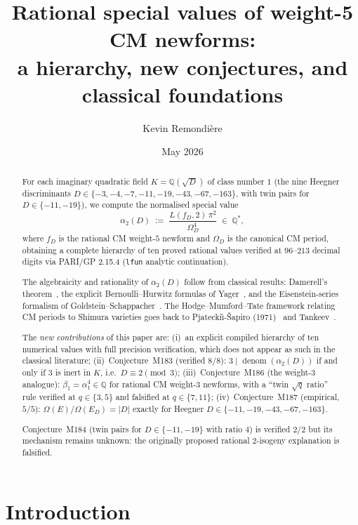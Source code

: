 \documentclass[12pt]{amsart}
\title{Rational special values of weight-5 CM newforms:\\
       a hierarchy, new conjectures, and classical foundations}
\author{Kevin Remondière}
\date{May 2026}
\theoremstyle{definition}
\DeclareMathOperator{\denom}{denom}
\newcommand{\Q}{\mathbb{Q}}
\newcommand{\Omega}{\varOmega}
\begin{document}
\begin{abstract}
For each imaginary quadratic field $K = \Q(\sqrt{D})$ of class number $1$
(the nine Heegner discriminants $D \in \{-3,-4,-7,-11,-19,-43,-67,-163\}$,
with twin pairs for $D \in \{-11,-19\}$),
we compute the normalised special value
\[
  \alpha_2(D) \;:=\; \frac{L(f_D,2)\,\pi^2}{\Omega_D^4} \;\in\; \Q^*,
\]
where $f_D$ is the rational CM weight-$5$ newform and $\Omega_D$ is the
canonical CM period, obtaining a complete hierarchy of ten proved rational
values verified at $96$--$213$ decimal digits via PARI/GP 2.15.4
(\texttt{lfun} analytic continuation).

The algebraicity and rationality of $\alpha_2(D)$ follow from classical results:
Damerell's theorem~\cite{Damerell1971}, the explicit Bernoulli--Hurwitz
formulas of Yager~\cite{Yager1982}, and the Eisenstein-series formalism of
Goldstein--Schappacher~\cite{GoldsteinSchappacher1981}.
The Hodge--Mumford--Tate framework relating CM periods to Shimura varieties
goes back to Pjatecki\u{\i}-\v{S}apiro (1971)~\cite{CITE-NEEDED-PS1971} and
Tankeev~\cite{CITE-NEEDED-Tankeev1990}.

The \emph{new contributions} of this paper are:
(i)~an explicit compiled hierarchy of ten numerical values with full precision
verification, which does not appear as such in the classical literature;
(ii)~Conjecture~M183 (verified $8/8$): $3 \mid \denom(\alpha_2(D))$
if and only if $3$ is inert in $K$, i.e.\ $D \equiv 2 \pmod{3}$;
(iii)~Conjecture~M186 (the weight-$3$ analogue): $\beta_1 = \alpha_1^4 \in \Q$
for rational CM weight-$3$ newforms, with a ``twin $\sqrt{q}$ ratio'' rule
verified at $q \in \{3,5\}$ and falsified at $q \in \{7, 11\}$;
(iv)~Conjecture~M187 (empirical, $5/5$): $\Omega(E)/\Omega(E_D) = |D|$
exactly for Heegner $D \in \{-11,-19,-43,-67,-163\}$.

Conjecture~M184 (twin pairs for $D \in \{-11,-19\}$ with ratio $4$)
is verified $2/2$ but its mechanism remains unknown: the originally proposed
rational $2$-isogeny explanation is falsified.
\end{abstract}

\maketitle
\tableofcontents

\section{Introduction}
\label{sec:intro}
\end{document}

